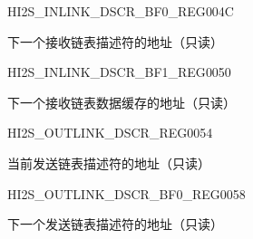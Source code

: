 \begin{register}{H}{I2S\_INLINK\_DSCR\_BF0\_REG}{\hexprefix{}004C}\label{regdesc:I2SINLINKDSCRBF0REG}
%
\regnewline%
\begin{regdesc}\begin{reglist}
\label{fielddesc:I2SINLINKDSCRBF0}\item [I2S\_INLINK\_DSCR\_BF0] 下一个接收链表描述符的地址（只读）
\end{reglist}\end{regdesc}
\end{register}


\begin{register}{H}{I2S\_INLINK\_DSCR\_BF1\_REG}{\hexprefix{}0050}\label{regdesc:I2SINLINKDSCRBF1REG}
%
\regnewline%
\begin{regdesc}\begin{reglist}
\label{fielddesc:I2SINLINKDSCRBF1}\item [I2S\_INLINK\_DSCR\_BF1] 下一个接收链表数据缓存的地址（只读）
\end{reglist}\end{regdesc}
\end{register}


\begin{register}{H}{I2S\_OUTLINK\_DSCR\_REG}{\hexprefix{}0054}\label{regdesc:I2SOUTLINKDSCRREG}
%
\regnewline%
\begin{regdesc}\begin{reglist}
\label{fielddesc:I2SOUTLINKDSCR}\item [I2S\_OUTLINK\_DSCR] 当前发送链表描述符的地址（只读）
\end{reglist}\end{regdesc}
\end{register}


\begin{register}{H}{I2S\_OUTLINK\_DSCR\_BF0\_REG}{\hexprefix{}0058}\label{regdesc:I2SOUTLINKDSCRBF0REG}
%
\regnewline%
\begin{regdesc}\begin{reglist}
\label{fielddesc:I2SOUTLINKDSCRBF0}\item [I2S\_OUTLINK\_DSCR\_BF0] 下一个发送链表描述符的地址（只读）
\end{reglist}\end{regdesc}
\end{register}


